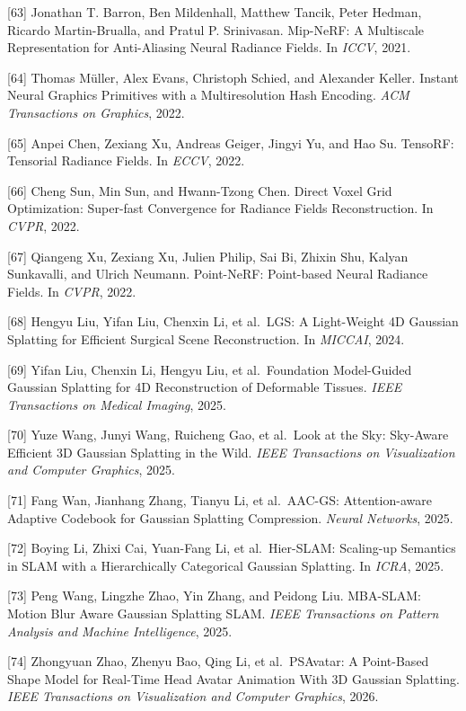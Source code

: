 {[}63{]} Jonathan T. Barron, Ben Mildenhall, Matthew Tancik, Peter Hedman, Ricardo Martin-Brualla, and Pratul P. Srinivasan. Mip-NeRF: A Multiscale Representation for Anti-Aliasing Neural Radiance Fields. In \emph{ICCV}, 2021.

{[}64{]} Thomas Müller, Alex Evans, Christoph Schied, and Alexander Keller. Instant Neural Graphics Primitives with a Multiresolution Hash Encoding. \emph{ACM Transactions on Graphics}, 2022.

{[}65{]} Anpei Chen, Zexiang Xu, Andreas Geiger, Jingyi Yu, and Hao Su. TensoRF: Tensorial Radiance Fields. In \emph{ECCV}, 2022.

{[}66{]} Cheng Sun, Min Sun, and Hwann-Tzong Chen. Direct Voxel Grid Optimization: Super-fast Convergence for Radiance Fields Reconstruction. In \emph{CVPR}, 2022.

{[}67{]} Qiangeng Xu, Zexiang Xu, Julien Philip, Sai Bi, Zhixin Shu, Kalyan Sunkavalli, and Ulrich Neumann. Point-NeRF: Point-based Neural Radiance Fields. In \emph{CVPR}, 2022.

{[}68{]} Hengyu Liu, Yifan Liu, Chenxin Li, et al.~LGS: A Light-Weight 4D Gaussian Splatting for Efficient Surgical Scene Reconstruction. In \emph{MICCAI}, 2024.

{[}69{]} Yifan Liu, Chenxin Li, Hengyu Liu, et al.~Foundation Model-Guided Gaussian Splatting for 4D Reconstruction of Deformable Tissues. \emph{IEEE Transactions on Medical Imaging}, 2025.

{[}70{]} Yuze Wang, Junyi Wang, Ruicheng Gao, et al.~Look at the Sky: Sky-Aware Efficient 3D Gaussian Splatting in the Wild. \emph{IEEE Transactions on Visualization and Computer Graphics}, 2025.

{[}71{]} Fang Wan, Jianhang Zhang, Tianyu Li, et al.~AAC-GS: Attention-aware Adaptive Codebook for Gaussian Splatting Compression. \emph{Neural Networks}, 2025.

{[}72{]} Boying Li, Zhixi Cai, Yuan-Fang Li, et al.~Hier-SLAM: Scaling-up Semantics in SLAM with a Hierarchically Categorical Gaussian Splatting. In \emph{ICRA}, 2025.

{[}73{]} Peng Wang, Lingzhe Zhao, Yin Zhang, and Peidong Liu. MBA-SLAM: Motion Blur Aware Gaussian Splatting SLAM. \emph{IEEE Transactions on Pattern Analysis and Machine Intelligence}, 2025.

{[}74{]} Zhongyuan Zhao, Zhenyu Bao, Qing Li, et al.~PSAvatar: A Point-Based Shape Model for Real-Time Head Avatar Animation With 3D Gaussian Splatting. \emph{IEEE Transactions on Visualization and Computer Graphics}, 2026.

